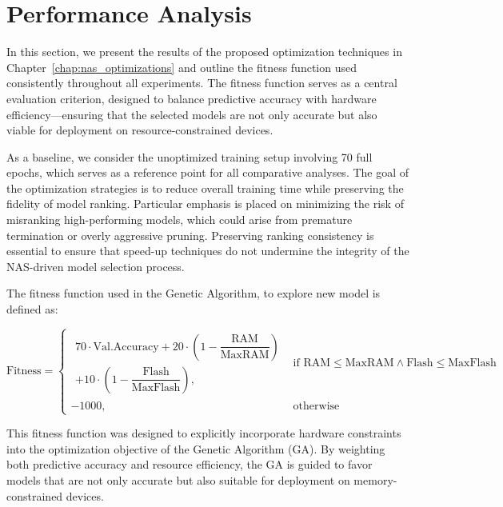 \chapter{Performance Analysis}
\label{chap:performance_analysis}

In this section, we present the results of the proposed optimization techniques in Chapter~\ref{chap:nas_optimizations} and outline the fitness function used consistently throughout all experiments. The fitness function serves as a central evaluation criterion, designed to balance predictive accuracy with hardware efficiency—ensuring that the selected models are not only accurate but also viable for deployment on resource-constrained devices.

As a baseline, we consider the unoptimized training setup involving 70 full epochs, which serves as a reference point for all comparative analyses. The goal of the optimization strategies is to reduce overall training time while preserving the fidelity of model ranking. Particular emphasis is placed on minimizing the risk of misranking high-performing models, which could arise from premature termination or overly aggressive pruning. Preserving ranking consistency is essential to ensure that speed-up techniques do not undermine the integrity of the NAS-driven model selection process.


The fitness function used in the Genetic Algorithm, to explore new model is defined as:

\sloppy
\begin{equation}
\text{Fitness} =
\begin{cases}
\begin{aligned}
70 \cdot \text{Val.Accuracy}
+ 20 \cdot \left(1 - \dfrac{\text{RAM}}{\text{MaxRAM}}\right) \\
+ 10 \cdot \left(1 - \dfrac{\text{Flash}}{\text{MaxFlash}}\right),
\end{aligned}
& \text{if } \text{RAM} \leq \text{MaxRAM} \land \text{Flash} \leq \text{MaxFlash} \\
-1000, & \text{otherwise}
\end{cases}
\label{eq:fitness_function}
\end{equation}



This fitness function was designed to explicitly incorporate hardware constraints into the optimization objective of the Genetic Algorithm (GA). By weighting both predictive accuracy and resource efficiency, the GA is guided to favor models that are not only accurate but also suitable for deployment on memory-constrained devices.

